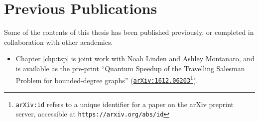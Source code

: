 \chapter*{Previous Publications}

Some of the contents of this thesis has been published previously, or completed in collaboration with other academics.

\begin{itemize}
\item Chapter \ref{chp:tsp} is joint work with Noah Linden and Ashley Montanaro, and is available as the pre-print ``Quantum Speedup of the Travelling Salesman Problem for bounded-degree graphs'' ({\tt \href{https://arxiv.org/abs/1612.06203}{arXiv:1612.06203}}\footnote{{\tt arXiv:id} refers to a unique identifier for a paper on the arXiv preprint server, accessible at {\tt https://arxiv.org/abs/id}}).
\end{itemize}